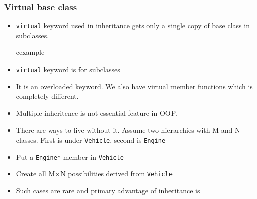 \begin{frame}
\frametitle{Virtual base class}
\begin{itemize}
\item \lstinline!virtual! keyword used in inheritance gets only a single 
	copy of base class in subclasses.
\begin{beamercolorbox}{cexample}
\codeMultVirt
\end{beamercolorbox}
\end{itemize}
\end{frame}

\begin{frame}
\begin{itemize}
\item \lstinline!virtual! keyword is for subclasses
\item It is an overloaded keyword. We also have virtual member
	functions which is completely different.
\item Multiple inheritence is not essential feature in OOP.
\item There are ways to live without it. Assume two hierarchies with
	M and N classes. First is under \lstinline!Vehicle!, second
	is \lstinline!Engine!
\item {} Put a \lstinline!Engine*!
	member in \lstinline!Vehicle!
\item {} Create all M$\times$N possibilities
	derived from \lstinline!Vehicle!
\item Such cases are rare and primary advantage of inheritance is 
\end{itemize}
\end{frame}



